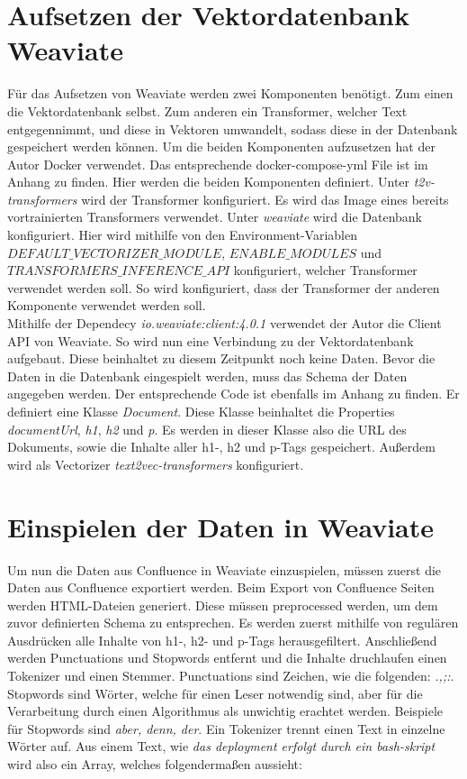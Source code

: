 \section{Aufsetzen der Vektordatenbank Weaviate}
Für das Aufsetzen von Weaviate werden zwei Komponenten benötigt.
Zum einen die Vektordatenbank selbst.
Zum anderen ein Transformer, welcher Text entgegennimmt, und diese in Vektoren umwandelt, sodass diese in der Datenbank gespeichert werden können.
Um die beiden Komponenten aufzusetzen hat der Autor Docker verwendet.
Das entsprechende docker-compose-yml File ist im Anhang zu finden.
Hier werden die beiden Komponenten definiert.
Unter \textit{t2v-transformers} wird der Transformer konfiguriert.
Es wird das Image eines bereits vortrainierten Transformers verwendet.
Unter \textit{weaviate} wird die Datenbank konfiguriert.
Hier wird mithilfe von den Environment-Variablen \textit{$DEFAULT\_VECTORIZER\_MODULE$}, \textit{$ENABLE\_MODULES$} und \textit{$TRANSFORMERS\_INFERENCE\_API$} konfiguriert, welcher Transformer verwendet werden soll.
So wird konfiguriert, dass der Transformer der anderen Komponente verwendet werden soll.\\

Mithilfe der Dependecy \textit{io.weaviate:client:4.0.1} verwendet der Autor die Client API von Weaviate.
So wird nun eine Verbindung zu der Vektordatenbank aufgebaut.
Diese beinhaltet zu diesem Zeitpunkt noch keine Daten.
Bevor die Daten in die Datenbank eingespielt werden, muss das Schema der Daten angegeben werden.
Der entsprechende Code ist ebenfalls im Anhang zu finden.
Er definiert eine Klasse \textit{Document}.
Diese Klasse beinhaltet die Properties \textit{documentUrl}, \textit{h1}, \textit{h2} und \textit{p}.
Es werden in dieser Klasse also die URL des Dokuments, sowie die Inhalte aller h1-, h2 und p-Tags gespeichert.
Außerdem wird als Vectorizer \textit{text2vec-transformers} konfiguriert.\\

\section{Einspielen der Daten in Weaviate}
Um nun die Daten aus Confluence in Weaviate einzuspielen, müssen zuerst die Daten aus Confluence exportiert werden.
Beim Export von Confluence Seiten werden HTML-Dateien generiert.
Diese müssen preprocessed werden, um dem zuvor definierten Schema zu entsprechen.
Es werden zuerst mithilfe von regulären Ausdrücken alle Inhalte von h1-, h2- und p-Tags herausgefiltert.
Anschließend werden Punctuations und Stopwords entfernt und die Inhalte druchlaufen einen Tokenizer und einen Stemmer.
Punctuations sind Zeichen, wie die folgenden: \textit{.,;:}.
Stopwords sind Wörter, welche für einen Leser notwendig sind, aber für die Verarbeitung durch einen Algorithmus als unwichtig erachtet werden.
Beispiele für Stopwords sind \textit{aber, denn, der}.
Ein Tokenizer trennt einen Text in einzelne Wörter auf.
Aus einem Text, wie \textit{das deployment erfolgt durch ein bash-skript} wird also ein Array, welches folgendermaßen aussieht:\\

